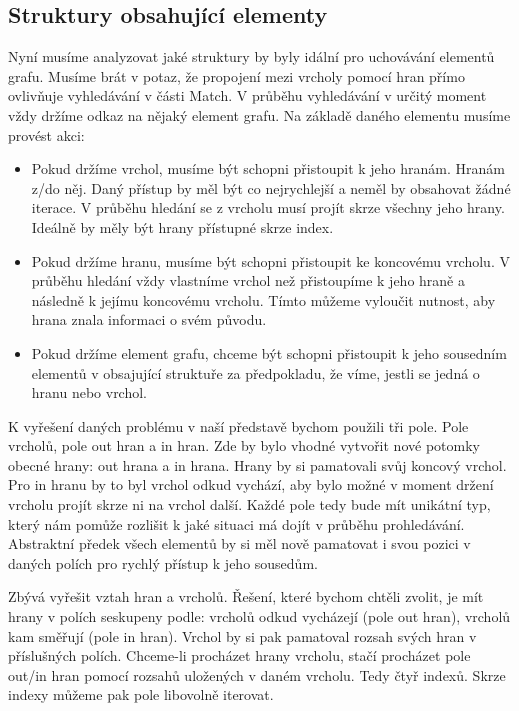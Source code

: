 \subsection{Struktury obsahující elementy}

Nyní musíme analyzovat jaké struktury by byly idální pro uchovávání elementů grafu.
Musíme brát v potaz, že propojení mezi vrcholy pomocí hran přímo ovlivňuje vyhledávání v části Match.
V průběhu vyhledávání v určitý moment vždy držíme odkaz na nějaký element grafu.
Na základě daného elementu musíme provést akci:

\begin{itemize}

\item Pokud držíme vrchol, musíme být schopni přistoupit k jeho hranám. Hranám z/do něj. Daný přístup by měl být co nejrychlejší a neměl by obsahovat žádné iterace. V průběhu hledání se z vrcholu musí projít skrze všechny jeho hrany. Ideálně by měly být hrany přístupné skrze index.

\item Pokud držíme hranu, musíme být schopni přistoupit ke koncovému vrcholu. V průběhu hledání vždy vlastníme vrchol než přistoupíme k jeho hraně a následně k jejímu koncovému vrcholu. Tímto můžeme vyloučit nutnost, aby hrana znala informaci o svém původu.

\item Pokud držíme element grafu, chceme být schopni přistoupit k jeho sousedním elementů v obsajující struktuře za předpokladu, že víme, jestli se jedná o hranu nebo vrchol. 

\end{itemize}

K vyřešení daných problému v naší představě bychom použili tři pole.
Pole vrcholů, pole out hran a in hran. 
Zde by bylo vhodné vytvořit nové potomky obecné hrany: out hrana a in hrana.
Hrany by si pamatovali svůj koncový vrchol.
Pro in hranu by to byl vrchol odkud vychází, aby bylo možné v moment držení vrcholu projít skrze ni na vrchol další.
Každé pole tedy bude mít unikátní typ, který nám pomůže rozlišit k jaké situaci má dojít v průběhu prohledávání.
Abstraktní předek všech elementů by si měl nově pamatovat i svou pozici v daných polích pro rychlý přístup k jeho sousedům.

Zbývá vyřešit vztah hran a vrcholů.
Řešení, které bychom chtěli zvolit, je mít hrany v polích seskupeny podle: vrcholů odkud vycházejí (pole out hran), vrcholů kam směřují (pole in hran).
Vrchol by si pak pamatoval rozsah svých hran v příslušných polích. 
Chceme-li procházet hrany vrcholu, stačí procházet pole out/in hran pomocí rozsahů uložených v daném vrcholu.
Tedy čtyř indexů.
Skrze indexy můžeme pak pole libovolně iterovat.

